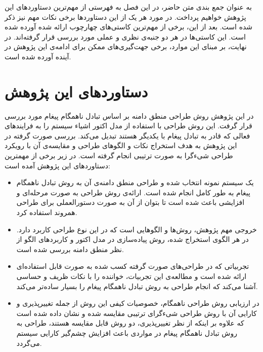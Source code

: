 به عنوان جمع بندی متن حاضر، در این فصل به فهرستی از مهم‌ترین دستاوردهای این پژوهش خواهیم پرداخت. در مورد هر یک از این دستاوردها برخی نکات مهم نیز ذکر شده است. بعد از این، برخی از مهم‌ترین کاستی‌های چهارچوب ارائه شده آورده شده است. این کاستی‌ها در هر دو جنبه‌ی نظری و عملی مورد بررسی قرار گرفته‌اند. در نهایت، بر مبنای این موارد، برخی جهت‌گیری‌های ممکن برای ادامه‌ی این پژوهش در آینده آورده شده است.

\section{دستاوردهای این پژوهش}
در این پژوهش روش طراحی منطق دامنه بر اساس تبادل ناهمگام پیغام مورد بررسی قرار گرفت. این روش طراحی با استفاده از مدل اکتور \cite{Agha_86} اشیاء سیستم را به فرایند‌های فعالی که قادر به تبادل پیغام با یکدیگر هستند تبدیل می‌کند. بررسی صورت گرفته در این پژوهش به هدف استخراج نکات و الگوهای طراحی و مقایسه‌ی آن با رویکرد طراحی شیءگرا به صورت ترتیبی انجام گرفته است. در  زیر برخی از مهمترین دستاوردهای این پژوهش آمده است:
\begin{itemize}
\item  یک سیستم نمونه انتخاب شده و طراحی منطق دامنه‌ی آن به روش تبادل ناهمگام پیغام به طور کامل انجام شده است. ارائه‌ی روش طراحی به صورت مرحله‌ای و افزایشی باعث شده است تا بتوان از آن به صورت دستورالعملی برای طراحی همروند استفاده کرد. 
\item خروجی مهم پژوهش، روش‌ها و الگوهایی است که در این نوع طراحی کاربرد دارد. در هر الگوی استخراج شده، روش پیاده‌سازی در مدل اکتور و کاربردهای الگو از نظر منطق دامنه بررسی شده است. 
\item تجربیاتی که در طراحی‌های صورت گرفته کسب شده به صورت قابل استفاده‌ای ارائه شده است و مطالعه‌ی این تجربیات، خواننده را با نکات ظریف و  حساسی آشنا می‌کند که انجام طراحی به روش تبادل ناهمگام پیغام را بسیار ساده‌تر می‌کند.
\item در ارزیابی روش طراحی ناهمگام، خصوصیات کیفی این روش از جمله تغییرپذیری و کارایی آن با روش طراحی شیءگرای ترتیبی مقایسه شده و نشان داده شده است که علاوه بر اینکه از نظر تغییرپذیری، دو روش قابل مقایسه هستند، طراحی به روش تبادل ناهمگام پیغام در مواردی باعث افزایش چشم‌گیر کارایی سیستم می‌گردد.
\end{itemize}
